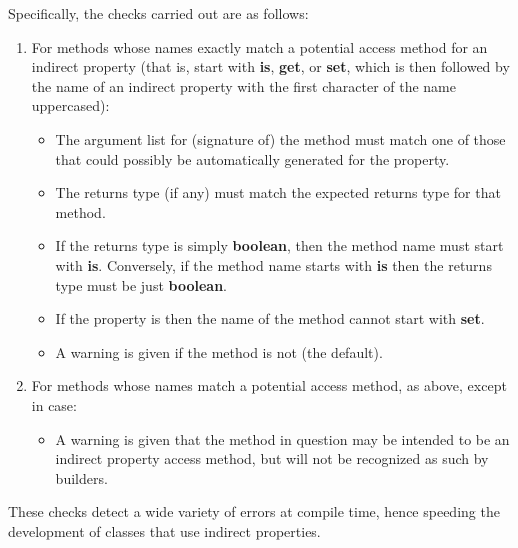 Specifically, the checks carried out are as follows:
\begin{enumerate}
\item For methods whose names exactly match a potential access method for
an indirect property (that is, start with \textbf{is}, \textbf{get},
or \textbf{set}, which is then followed by the name of an indirect
property with the first character of the name uppercased):
\begin{itemize}
\item The argument list for (signature of) the method must match one of
those that could possibly be automatically generated for the property.
\item The returns type (if any) must match the expected returns type for
that method.
\item If the returns type is simply \textbf{boolean}, then the method name
must start with \textbf{is}.
Conversely, if the method name starts with \textbf{is} then the returns
type must be just \textbf{boolean}.
\item If the property is  then the name of the method
cannot start with \textbf{set}.
\item A warning is given if the method is not  (the default).
\end{itemize}
\item For methods whose names match a potential access method, as above,
except in case:
\begin{itemize}
\item A warning is given that the method in question may be intended to
be an indirect property access method, but will not be recognized as
such by builders.
\end{itemize}
\end{enumerate}
 These checks detect a wide variety of errors at compile time, hence
speeding the development of classes that use indirect properties.
